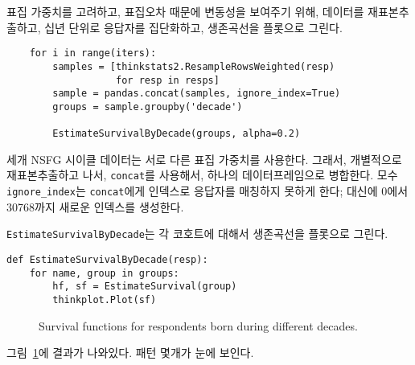 표집 가중치를 고려하고, 표집오차 때문에 변동성을 보여주기 위해, 데이터를 재표본추출하고, 십년 단위로 응답자를 집단화하고, 생존곡선을 플롯으로 그린다.

\begin{verbatim}
    for i in range(iters):
        samples = [thinkstats2.ResampleRowsWeighted(resp) 
                   for resp in resps]
        sample = pandas.concat(samples, ignore_index=True)
        groups = sample.groupby('decade')

        EstimateSurvivalByDecade(groups, alpha=0.2)
\end{verbatim}

세개 NSFG 시이클 데이터는 서로 다른 표집 가중치를 사용한다. 그래서, 개별적으로 재표본추출하고 나서, {\tt concat}를 사용해서, 하나의 데이터프레임으로 병합한다. 모수 \verb"ignore_index"는 {\tt concat}에게
인덱스로 응답자를 매칭하지 못하게 한다; 대신에 0에서 30768까지 새로운 인덱스를 생성한다.

{\tt EstimateSurvivalByDecade}는 각 코호트에 대해서 생존곡선을 플롯으로 그린다.

\begin{verbatim}
def EstimateSurvivalByDecade(resp):
    for name, group in groups:
        hf, sf = EstimateSurvival(group)
        thinkplot.Plot(sf)
\end{verbatim}

\begin{figure}
\caption{Survival functions for respondents born during different decades.}
\label{survival4}
\end{figure}

그림~\ref{survival4}에 결과가 나와있다.
패턴 몇개가 눈에 보인다.

